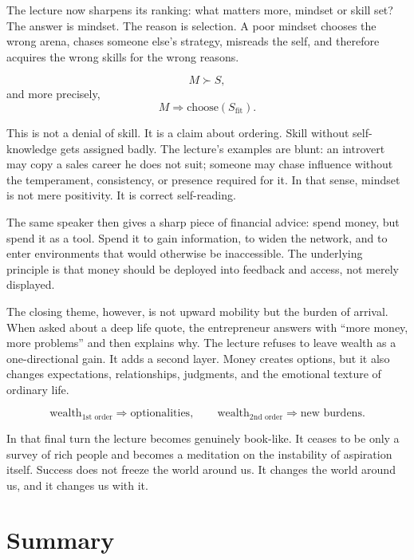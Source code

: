 The lecture now sharpens its ranking: what matters more, mindset or skill set? The answer is mindset. The reason is selection. A poor mindset chooses the wrong arena, chases someone else's strategy, misreads the self, and therefore acquires the wrong skills for the wrong reasons.

\begin{equation}
M \succ S,
\end{equation}
and more precisely,
\begin{equation}
M \Rightarrow \text{choose}(S_{\text{fit}}).
\end{equation}

This is not a denial of skill. It is a claim about ordering. Skill without self-knowledge gets assigned badly. The lecture's examples are blunt: an introvert may copy a sales career he does not suit; someone may chase influence without the temperament, consistency, or presence required for it. In that sense, mindset is not mere positivity. It is correct self-reading.

The same speaker then gives a sharp piece of financial advice: spend money, but spend it as a tool. Spend it to gain information, to widen the network, and to enter environments that would otherwise be inaccessible. The underlying principle is that money should be deployed into feedback and access, not merely displayed.

The closing theme, however, is not upward mobility but the burden of arrival. When asked about a deep life quote, the entrepreneur answers with ``more money, more problems'' and then explains why. The lecture refuses to leave wealth as a one-directional gain. It adds a second layer. Money creates options, but it also changes expectations, relationships, judgments, and the emotional texture of ordinary life.

\begin{equation}
\text{wealth}_{1\text{st order}} \Rightarrow \text{optionalities},\qquad
\text{wealth}_{2\text{nd order}} \Rightarrow \text{new burdens}.
\end{equation}

In that final turn the lecture becomes genuinely book-like. It ceases to be only a survey of rich people and becomes a meditation on the instability of aspiration itself. Success does not freeze the world around us. It changes the world around us, and it changes us with it.

\section{Summary}

